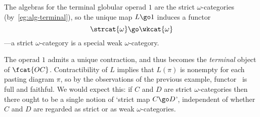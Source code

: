 \begin{example}	
The algebras for the terminal%
%
% 
globular operad $1$ are the strict%
%
%
$\omega$-categories (by~\ref{eg:alg-terminal}), so the unique map $L \go 1$
induces a functor
%
\begin{equation}	\label{eq:str-to-wk}
\strcat{\omega} \go \wkcat{\omega}
\end{equation}
%
---a strict $\omega$-category is a special weak $\omega$-category.

The operad $1$ admits a unique contraction, and thus becomes the
\emph{terminal} object of $\fcat{OC}$.  Contractibility of $L$ implies that
$L(\pi)$ is nonempty for each pasting diagram $\pi$, so by the observations
of the previous example, functor~ is full and faithful.
We would expect this: if $C$ and $D$ are strict $\omega$-categories then
there ought to be a single notion of `strict map $C \go D$', independent of
whether $C$ and $D$ are regarded as strict or as weak $\omega$-categories.
\end{example}

